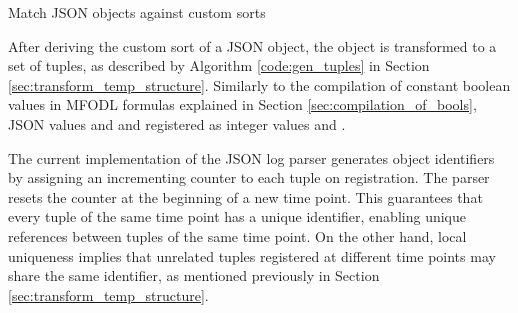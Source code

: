 \begin{algorithm}
	\LinesNumbered
	\label{code:signature_matching}
	\caption{Match JSON objects against custom sorts}
	\; \label{line:match_sort_call}
\end{algorithm}

After deriving the custom sort of a JSON object, the object is transformed to a set of tuples, as described by Algorithm \ref{code:gen_tuples} in Section \ref{sec:transform_temp_structure}. Similarly to the compilation of constant boolean values in MFODL formulas explained in Section \ref{sec:compilation_of_bools}, JSON values  and  and registered as integer values  and .

The current implementation of the JSON log parser generates object identifiers by assigning an incrementing counter to each tuple on registration. The parser resets the counter at the beginning of a new time point. This guarantees that every tuple of the same time point has a unique identifier, enabling unique references between tuples of the same time point. On the other hand, local uniqueness implies that unrelated tuples registered at different time points may share the same identifier, as mentioned previously in Section \ref{sec:transform_temp_structure}.

